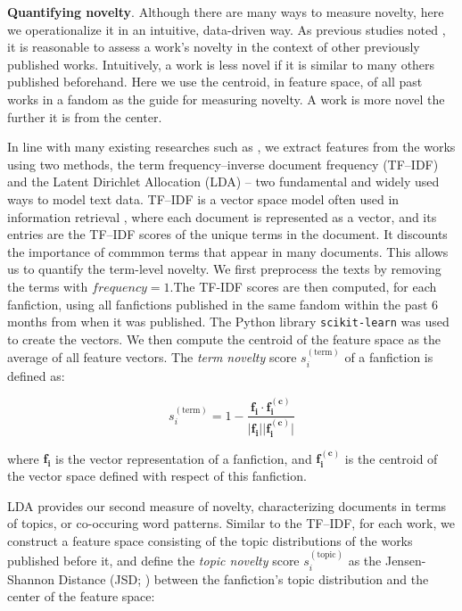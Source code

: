 \documentclass[letterpaper]{article} %
\begin{document}
\textbf{Quantifying novelty}. Although there are many ways to measure novelty, here we operationalize it in an intuitive, data-driven way. As previous studies noted \cite{askin2017makes,de2015game}, it is reasonable to assess a work's novelty in the context of other previously published works. Intuitively, a work is less novel if it is similar to many others published beforehand. Here we use the centroid, in feature space, of all past works in a fandom as the guide for measuring novelty. A work is more novel the further it is from the center. 

In line with many existing researches such as \cite{klingenstein2014civilizing,barron2018individuals,horvat2018role}, we extract features from the works using two methods, the term frequency--inverse document frequency (TF--IDF) and the Latent Dirichlet Allocation (LDA) \cite{blei2003latent} -- two  fundamental and widely used ways to model text data. TF--IDF is a vector space model often used in information retrieval \cite{salton1988term}, where each document is represented as a vector, and its entries are the TF--IDF scores of the unique terms in the document. It discounts the importance of commmon terms that appear in many documents. This allows us to quantify the term-level novelty. We first preprocess the texts by removing the terms with $frequency = 1$.The TF-IDF scores are then computed, for each fanfiction, using all fanfictions published in the same fandom within the past 6 months from when it was published. The Python library \texttt{scikit-learn} was used to create the vectors. We then compute the centroid of the feature space as the average of all feature vectors. The \emph{term novelty} score $s_{i}^{(\mathrm{term})}$ of a fanfiction is defined as:

\begin{equation}
s_{i}^{(\mathrm{term})} = 1-\frac{\boldsymbol{f_i} \cdot{\boldsymbol{f_i^{(c)}}}} {\lvert \boldsymbol{f_i} \rvert \lvert \boldsymbol{f_i^{(c)}} \rvert}
\end{equation}

where $\boldsymbol{f_i}$ is the vector representation of a fanfiction, and $\boldsymbol{f_i^{(c)}}$ is the centroid of the vector space defined with respect of this fanfiction.

LDA provides our second measure of novelty, characterizing documents in terms of topics, or co-occuring word patterns. Similar to the TF--IDF, for each work, we construct a feature space consisting of the topic distributions of the works published before it, and define the \emph{topic novelty} score $s_{i}^{(\mathrm{topic})}$ as the Jensen-Shannon Distance (JSD; \cite{klingenstein2014civilizing}) between the fanfiction's topic distribution and the center of the feature space:
\end{document}

